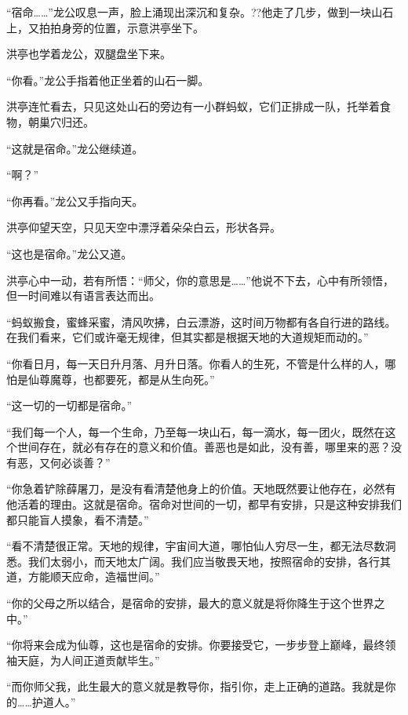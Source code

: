 
\begin{this_body}



“宿命……”龙公叹息一声，脸上涌现出深沉和复杂。??他走了几步，做到一块山石上，又拍拍身旁的位置，示意洪亭坐下。

洪亭也学着龙公，双腿盘坐下来。

“你看。”龙公手指着他正坐着的山石一脚。

洪亭连忙看去，只见这处山石的旁边有一小群蚂蚁，它们正排成一队，托举着食物，朝巢穴归还。

“这就是宿命。”龙公继续道。

“啊？”

“你再看。”龙公又手指向天。

洪亭仰望天空，只见天空中漂浮着朵朵白云，形状各异。

“这也是宿命。”龙公又道。

洪亭心中一动，若有所悟：“师父，你的意思是……”他说不下去，心中有所领悟，但一时间难以有语言表达而出。

“蚂蚁搬食，蜜蜂采蜜，清风吹拂，白云漂游，这时间万物都有各自行进的路线。在我们看来，它们或许毫无规律，但其实都是根据天地的大道规矩而动的。”

“你看日月，每一天日升月落、月升日落。你看人的生死，不管是什么样的人，哪怕是仙尊魔尊，也都要死，都是从生向死。”

“这一切的一切都是宿命。”

“我们每一个人，每一个生命，乃至每一块山石，每一滴水，每一团火，既然在这个世间存在，就必有存在的意义和价值。善恶也是如此，没有善，哪里来的恶？没有恶，又何必谈善？”

“你急着铲除薛屠刀，是没有看清楚他身上的价值。天地既然要让他存在，必然有他活着的理由。这就是宿命。宿命对世间的一切，都早有安排，只是这种安排我们都只能盲人摸象，看不清楚。”

“看不清楚很正常。天地的规律，宇宙间大道，哪怕仙人穷尽一生，都无法尽数洞悉。我们太弱小，而天地太广阔。我们应当敬畏天地，按照宿命的安排，各行其道，方能顺天应命，造福世间。”

“你的父母之所以结合，是宿命的安排，最大的意义就是将你降生于这个世界之中。”

“你将来会成为仙尊，这也是宿命的安排。你要接受它，一步步登上巅峰，最终领袖天庭，为人间正道贡献毕生。”

“而你师父我，此生最大的意义就是教导你，指引你，走上正确的道路。我就是你的……护道人。”


\end{this_body}
